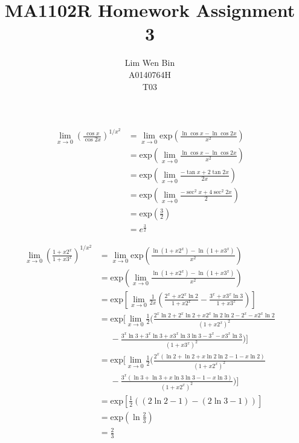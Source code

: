 \documentclass[12pt]{article}
\newenvironment{problem}[2][Problem]{\begin{trivlist}
\item[\hskip \labelsep {\bfseries #1}\hskip \labelsep {\bfseries #2.}]}{\end{trivlist}}
\begin{document}
\title{MA1102R Homework Assignment 3}
\author{Lim Wen Bin \\
A0140764H\\
T03}
\maketitle

\begin{problem}{1}
\end{problem}
\begin{align*}
\lim_{x \to 0} \left( \frac{\cos x}{\cos 2x} \right)^{1/x^2} &=
\lim_{x \to 0}
\text{exp}\left(\frac{\ln \cos x - \ln \cos 2x}{x^2}\right) 
\\
&=
\text{exp}\left(
\lim_{x \to 0}
\frac{\ln \cos x - \ln \cos 2x}{x^2}
\right) 
\\
&=
\text{exp}\left(
\lim_{x \to 0}
\frac{-\tan x + 2\tan 2x}{2x}
\right)
\\
&=
\text{exp}\left(
\lim_{x \to 0}
\frac{-\sec^2 x + 4\sec^2 2x}{2}
\right) 
\\
&=
\text{exp}\left(
\frac{3}{2}
\right) \\
&= e^{\frac{3}{2}}
\end{align*}
\filbreak

\begin{problem}{1.b}
\end{problem}
\begin{align*}
\lim_{x \to 0} \left( \frac{1+x2^x}{1+x3^x} \right)^{1/x^2} &=
\lim_{x \to 0}
\text{exp}\left(\frac{\ln(1+x2^x)-\ln(1+x3^x)}{x^2}\right) 
\\
&=
\text{exp}\left(
\lim_{x \to 0}
\frac{\ln(1+x2^x)-\ln(1+x3^x)}
{x^2}
\right)
\\
&=
\text{exp}\left[
\lim_{x \to 0}
\frac{1}{2x} 
\left(
\frac{2^x+x2^x\ln2}{1+x2^x} - \frac{3^x+x3^x\ln3}{1+x3^x}
\right)
\right] 
\\
&=
\text{exp}\biggl[
\lim_{x \to 0}
\frac{1}{2} 
\biggl(
\frac{2^x\ln2 + 2^x\ln2 + x2^x\ln2\ln2 - 2^x-x2^x\ln2} {(1+x2^x)^2} \\
&\phantom{=}- 
\frac{3^x\ln3 + 3^x\ln3 + x3^x\ln3\ln3 - 3^x-x3^x\ln3} {(1+x3^x)^2} 
\biggl)
\biggl] 
\\
&=
\text{exp}\biggl[
\lim_{x \to 0}
\frac{1}{2} 
\biggl(
\frac{2^x(\ln2 + \ln2 + x\ln2\ln2 - 1 -x\ln2)} {(1+x2^x)^2} \\
&\phantom{=}- 
\frac{3^x(\ln3 + \ln3 + x\ln3\ln3 - 1 -x\ln3)} {(1+x2^x)^2} 
\biggl)
\biggl] 
\\
&=
\text{exp}[
\frac{1}{2}(
(2\ln2 - 1)
- 
(2\ln3 - 1)
)]
\\
&=
\text{exp}(
\ln\frac{2}{3}
)\\
&= \frac{2}{3}
\end{align*}
\filbreak
\end{document}
